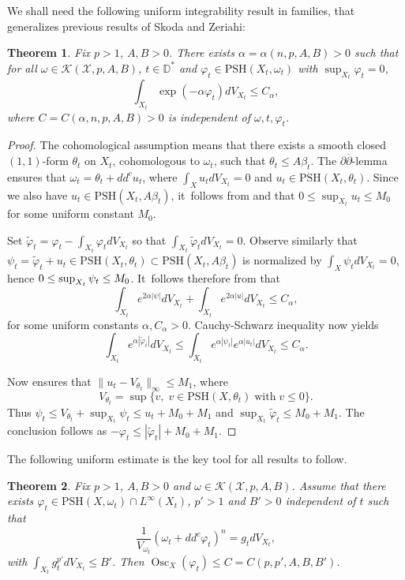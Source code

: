 \documentclass[11pt]{article}
\numberwithin{equation}{section}
\DeclareMathOperator{\Osc}{Osc}
\newtheorem{theorem}{Theorem}[section]
\theoremstyle{definition}
\newcommand{\D}{\mathbb D}
\let\f\varphi
\let\p\psi
\newcommand \PSH {\mathrm{PSH}}
\begin{document}
We shall need the following uniform integrability result in families, that
generalizes previous results of Skoda and Zeriahi:

\begin{theorem} \label{thm:sz}
Fix $p>1$, $A,B>0$. There exists $\alpha=\alpha(n,p,A,B)>0$ such that for all
$\omega \in {\mathcal K}(\mathcal{X},p,A,B)$, $t \in \D^*$ and
$\f_t \in \PSH(X_t,\omega_t)$ with $\sup_{X_t} \f_t=0$,
\[
\int_{X_t} \exp(-\alpha \f_t) dV_{X_t} \leq C_{\alpha},
\]
where $C=C(\alpha,n,p,A,B)>0$ is independent of $\omega,t,\f_t$.
\end{theorem}

\begin{proof}
The cohomological assumption means that there exists a smooth closed $(1,1)$-form $\theta_t$ on $X_t$,
cohomologous to $\omega_t$, such that $\theta_t \leq A\beta_t$.
The $\partial\overline{\partial}$-lemma ensures that $\omega_t=\theta_t+dd^c u_t$, where
$\int _X u_t dV_{X_t} =0$ and $u_t \in \PSH(X_t,\theta_t)$.
Since we also have $u_t \in \PSH(X_t, A \beta_t)$, it~follows from \cite[Conj.\,3.1]{DnGG23} and \cite[Cor.\,4.8]{Ou22}
that $0 \leq \sup_{X_t} u_t \leq M_0$ for some uniform constant $M_0$.

Set $\tilde{\f}_t=\f_t-\int_{X_t} \f_t dV_{X_t}$ so that $\int_{X_t} \tilde{\f}_t dV_{X_t}=0$.
Observe similarly that $ \psi_t=\tilde{\f}_t+u_t \in \PSH(X_t, \theta_t) \subset\PSH(X_t, A \beta_t)$
is normalized by $\int_{X} \psi_t dV_{X_t}=0$,
hence $0 \leq\nobreak \sup_{X_t} \psi_t \leq M_0$. It~follows therefore from \cite[Th.\,2.9]{DnGG23} that
\[
\int_{X_t} e^{2\alpha|\psi|}dV_{X_t} + \int_{X_t} e^{2\alpha| u |}dV_{X_t} \leq C_\alpha,
\]
for some uniform constants $\alpha,C_\alpha>0$.
Cauchy-Schwarz inequality now yields
\[
\int_{X_t} e^{\alpha |\tilde{\f}_t| } dV_{X_t}
\leq \int_{X_t} e^{\alpha |\psi_t| } e^{\alpha |u_t| } dV_{X_t}
\leq C_\alpha.
\]

Now \cite[Th.\,1.9]{DnGG23} ensures that $\|u_t-V_{\theta_t}\|_{\infty} \leq M_1$,
where
\[
V_{\theta_t}=\sup \{v, \; v \in\PSH(X,\theta_t) \; \text{with} \; v \leq 0 \}.
\]
Thus $\p_t \leq V_{\theta_t}+\sup_{X_t} \p_t \leq u_t+M_0+M_1$ and $\sup_{X_t} \tilde{\f}_t \leq M_0+M_1$.
The conclusion follows as $-\f_t \leq |\tilde{\f}_t|+M_0+M_1$.
\end{proof}

The following uniform estimate is the key tool for all results to follow.

\begin{theorem} \label{thm:uniformMA}
Fix $p>1$, $A,B>0$ and $\omega \in {\mathcal K}(\mathcal{X},p,A,B)$.
Assume that there exists $\f_t \in\PSH(X,\omega_t) \cap L^{\infty}(X_t)$,
$p'>1$ and $B'>0$ independent of $t$ such that
\[
\frac{1}{V_{\omega_t}}(\omega_t+dd^c \f_t)^n=g_t dV_{X_t},
\]
with $\int_{X_t} g_t^{p'} dV_{X_t} \leq B'$.
Then $\Osc_X(\f_t) \leq C=C(p,p',A,B,B')$.
\end{theorem}
\end{document}
